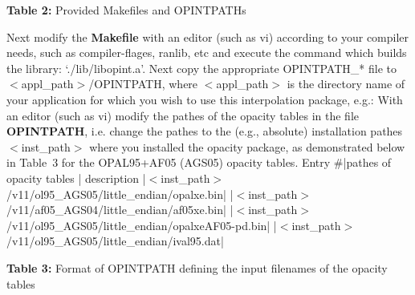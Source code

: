 \bigskip
\centerline{{\bf Table 2:} Provided Makefiles and OPINTPATHs}
\bigskip
Next modify the {\bf Makefile} with an editor (such as vi) according to your
compiler needs, such as compiler-flages, ranlib, etc and execute the command
\medskip
{}
\medskip
which builds the library: `./lib/libopint.a'.\hfil\break
Next copy the appropriate OPINTPATH\_* file to $<$appl\_path$>$/OPINTPATH, where
$<$appl\_path$>$ is the directory name of your application for which you wish to
use this interpolation package, e.g.:
\medskip
{}
\medskip
With an editor (such as vi) modify the pathes
of the opacity tables in the file {\bf OPINTPATH}, i.e. change the pathes
to the (e.g., absolute) installation pathes $<$inst\_path$>$ where you installed the
opacity package, as demonstrated below in Table~3 for the OPAL95+AF05 (AGS05)
opacity tables.
\medskip
{\small
\TightTables
{}
Entry \#|pathes of opacity tables                                | description        |$<$inst\_path$>$/v11/ol95\_AGS05/little\_endian/opalxe.bin\hfill|\parasize=4.1cm
                                                                     |$<$inst\_path$>$/v11/af05\_AGS04/little\_endian/af05xe.bin\hfill|\parasize=4.1cm
                                                                     |$<$inst\_path$>$/v11/ol95\_AGS05/little\_endian/opalxeAF05-pd.bin\hfill|\parasize=4.1cm
                                                                              |$<$inst\_path$>$/v11/ol95\_AGS05/little\_endian/ival95.dat\hfill|\parasize=4.1cm
\endruledtable
}%
\medskip
\centerline{{\bf Table 3:} Format of OPINTPATH defining the input filenames 
            of the opacity tables}
\bigskip
